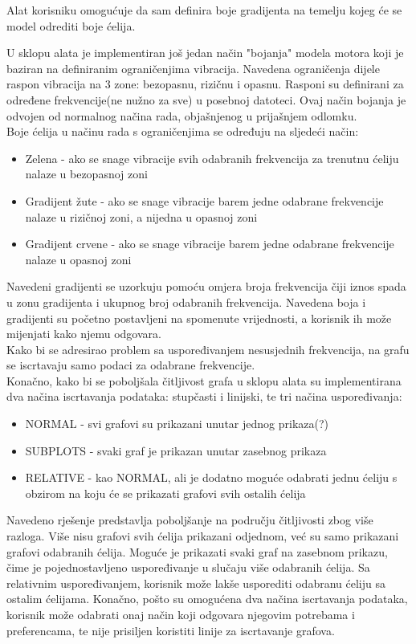 \documentclass[times, utf8, diplomski]{fer}
\begin{document}
Alat korisniku omogućuje da sam definira boje gradijenta na temelju kojeg će se model odrediti boje ćelija.

U sklopu alata je implementiran još jedan način "bojanja" modela motora koji je baziran na definiranim ograničenjima vibracija. Navedena ograničenja dijele raspon vibracija na 3 zone: bezopasnu, rizičnu i opasnu. Rasponi su definirani za određene frekvencije(ne nužno za sve) u posebnoj datoteci. Ovaj način bojanja je odvojen od normalnog načina rada, objašnjenog u prijašnjem odlomku. 
\\
Boje ćelija u načinu rada s ograničenjima se određuju na sljedeći način:
\begin{itemize}
\item Zelena - ako se snage vibracije svih odabranih frekvencija za trenutnu ćeliju nalaze u bezopasnoj zoni
\item Gradijent žute - ako se snage vibracije barem jedne odabrane frekvencije nalaze u rizičnoj zoni, a nijedna u opasnoj zoni
\item Gradijent crvene - ako se snage vibracije barem jedne odabrane frekvencije nalaze u opasnoj zoni\\
\end{itemize}
Navedeni gradijenti se uzorkuju pomoću omjera broja frekvencija čiji iznos spada u zonu gradijenta i ukupnog broj odabranih frekvencija. Navedena boja i gradijenti su početno postavljeni na spomenute vrijednosti, a korisnik ih može mijenjati kako njemu odgovara.\\
Kako bi se adresirao problem sa uspoređivanjem nesusjednih frekvencija, na grafu se iscrtavaju samo podaci za odabrane frekvencije.\\
Konačno, kako bi se poboljšala čitljivost grafa u sklopu alata su implementirana dva načina iscrtavanja podataka: stupčasti i linijski, te tri načina uspoređivanja:
\begin{itemize}
\item NORMAL - svi grafovi su prikazani unutar jednog prikaza(?)
\item SUBPLOTS - svaki graf je prikazan unutar zasebnog prikaza
\item RELATIVE - kao NORMAL, ali je dodatno moguće odabrati jednu ćeliju s obzirom na koju će se prikazati grafovi svih ostalih ćelija\\
\end{itemize}
Navedeno rješenje predstavlja poboljšanje na području čitljivosti zbog više razloga. Više nisu grafovi svih ćelija prikazani odjednom, već su samo prikazani grafovi odabranih ćelija. Moguće je prikazati svaki graf na zasebnom prikazu, čime je pojednostavljeno uspoređivanje u slučaju više odabranih ćelija. Sa relativnim uspoređivanjem, korisnik može lakše usporediti odabranu ćeliju sa ostalim ćelijama. Konačno, pošto su omogućena dva načina iscrtavanja podataka, korisnik može odabrati onaj način koji odgovara njegovim potrebama i preferencama, te nije prisiljen koristiti linije za iscrtavanje grafova.
\end{document}
